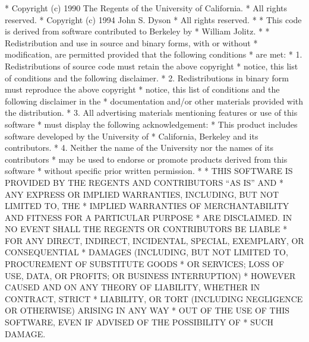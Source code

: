 \begin{copyrightEnv}
 * Copyright (c) 1990 The Regents of the University of California.
 * All rights reserved.
 * Copyright (c) 1994 John S. Dyson
 * All rights reserved.
 *
 * This code is derived from software contributed to Berkeley by
 * William Jolitz.
 *
 * Redistribution and use in source and binary forms, with or without
 * modification, are permitted provided that the following conditions
 * are met:
 * 1. Redistributions of source code must retain the above copyright
 *    notice, this list of conditions and the following disclaimer.
 * 2. Redistributions in binary form must reproduce the above copyright
 *    notice, this list of conditions and the following disclaimer in the
 *    documentation and/or other materials provided with the distribution.
 * 3. All advertising materials mentioning features or use of this software
 *    must display the following acknowledgement:
 *      This product includes software developed by the University of
 *      California, Berkeley and its contributors.
 * 4. Neither the name of the University nor the names of its contributors
 *    may be used to endorse or promote products derived from this software
 *    without specific prior written permission.
 *
 * THIS SOFTWARE IS PROVIDED BY THE REGENTS AND CONTRIBUTORS ``AS IS'' AND
 * ANY EXPRESS OR IMPLIED WARRANTIES, INCLUDING, BUT NOT LIMITED TO, THE
 * IMPLIED WARRANTIES OF MERCHANTABILITY AND FITNESS FOR A PARTICULAR PURPOSE
 * ARE DISCLAIMED.  IN NO EVENT SHALL THE REGENTS OR CONTRIBUTORS BE LIABLE
 * FOR ANY DIRECT, INDIRECT, INCIDENTAL, SPECIAL, EXEMPLARY, OR CONSEQUENTIAL
 * DAMAGES (INCLUDING, BUT NOT LIMITED TO, PROCUREMENT OF SUBSTITUTE GOODS
 * OR SERVICES; LOSS OF USE, DATA, OR PROFITS; OR BUSINESS INTERRUPTION)
 * HOWEVER CAUSED AND ON ANY THEORY OF LIABILITY, WHETHER IN CONTRACT, STRICT
 * LIABILITY, OR TORT (INCLUDING NEGLIGENCE OR OTHERWISE) ARISING IN ANY WAY
 * OUT OF THE USE OF THIS SOFTWARE, EVEN IF ADVISED OF THE POSSIBILITY OF
 * SUCH DAMAGE.
\end{copyrightEnv}

